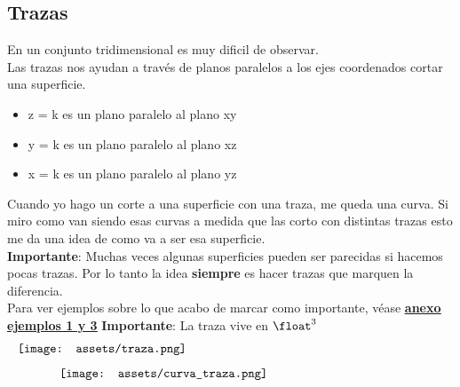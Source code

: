 \documentclass[10pt,a4paper]{article}
\begin{document}
\subsection*{Trazas}
En un conjunto tridimensional es muy dificil de observar. \\
Las trazas nos ayudan a través de planos paralelos a los ejes coordenados cortar una superficie.
\begin{itemize}
    \item z = k es un plano paralelo al plano xy
    \item y = k es un plano paralelo al plano xz
    \item x = k es un plano paralelo al plano yz
\end{itemize}
Cuando yo hago un corte a una superficie con una traza, me queda una curva. Si miro como van siendo esas curvas a medida que las corto con distintas trazas esto me da una idea de como va a ser esa superficie. \\
\textbf{Importante}: Muchas veces algunas superficies pueden ser parecidas si hacemos pocas trazas. Por lo tanto la idea \textbf{siempre} es hacer trazas que marquen la diferencia. \\
Para ver ejemplos sobre lo que acabo de marcar como importante, véase \hyperref[subsec:dibujando_cuadricas_con_trazas]{\textbf{\underline{anexo ejemplos 1 y 3}}} 
\textbf{Importante}: La traza vive en $\float^{3}$
\[\begin{minipage}[b]{1\textwidth}
    \texttt{[image: assets/traza.png]}
\end{minipage}\]
\[\begin{minipage}[b]{0.8\textwidth}
    \texttt{[image: assets/curva\_traza.png]}
\end{minipage}\]
\end{document}
